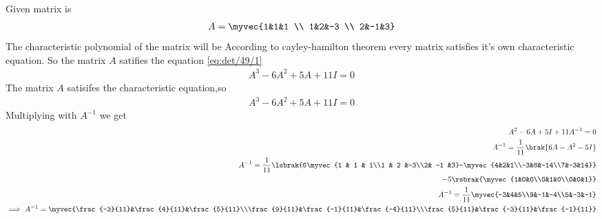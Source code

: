 Given matrix is 
\begin{align}
    A=\myvec{1&1&1 \\ 1&2&-3 \\ 2&-1&3}\label{eq:det/49/2}
\end{align}
The characteristic polynomial of the matrix will be
According to cayley-hamilton theorem every matrix satisfies it's own characteristic equation. So the matrix $A$ satifies the equation \eqref{eq:det/49/1}
\begin{align}
    A^3-6A^2+5A+11I=0\label{eq:det/49/4}
\end{align}
The matrix $A$ satisifes the characteristic equation,so
\begin{align}
    A^3-6A^2+5A+11I=0
\end{align}
Multiplying with $A^{-1}$ we get
\begin{align}
    A^2-6A+5I+11A^{-1}=0\\
    A^{-1}=\frac{1}{11}\brak{6A-A^2-5I}\\
    A^{-1}=\frac{1}{11}\lsbrak{6\myvec{1 & 1 & 1\\1 & 2 &-3\\2& -1 &3}-\myvec{4&2&1\\-3&8&-14\\7&-3&14}}\\
    -5\rsbrak{\myvec{1&0&0\\0&1&0\\0&0&1}}\\
    A^{-1}=\frac{1}{11}\myvec{-3&4&5\\9&-1&-4\\5&-3&-1}
\\
\implies
    A^{-1}=\myvec{\frac{-3}{11}&\frac{4}{11}&\frac{5}{11}\\\frac{9}{11}&\frac{-1}{11}&\frac{-4}{11}\\\frac{5}{11}&\frac{-3}{11}&\frac{-1}{11}}
\end{align}
